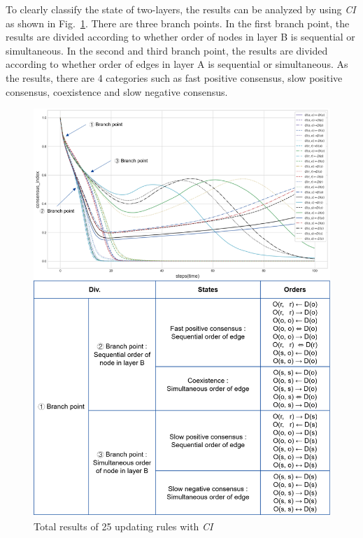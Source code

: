 To clearly classify the state of two-layers, the results can be analyzed by using \textit{CI} as shown in Fig.~\ref{ordertotal2}. There are three branch points. In the first branch point, the results are divided according to whether order of nodes in layer B is sequential or simultaneous. In the second and third branch point, the results are divided according to whether order of edges in layer A is sequential or simultaneous. As the results, there are 4 categories such as fast positive consensus, slow positive consensus, coexistence and slow negative consensus. 
\begin{figure}[!htb]
	\centering
	\includegraphics[width=\hsize]{figure/ordertotal2.png}
	\caption{Total results of 25 updating rules with \textit{CI}}
	\label{ordertotal2}
\end{figure}
